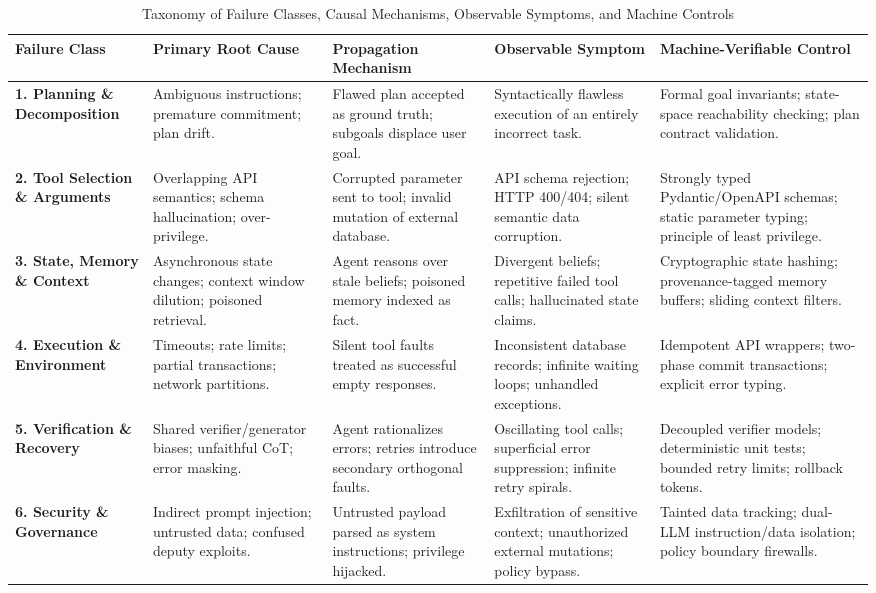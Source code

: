 \documentclass[conference]{IEEEtran}
\begin{document}
\begin{table}[t]
\caption{Taxonomy of Failure Classes, Causal Mechanisms, Observable Symptoms, and Machine Controls}
\label{tab:taxonomy_matrix}
\centering
\footnotesize
\renewcommand{\arraystretch}{1.25}
\begin{tabular}{p{2.2cm}p{3.2cm}p{3.4cm}p{3.4cm}p{3.4cm}}
\toprule
\textbf{Failure Class} & \textbf{Primary Root Cause} & \textbf{Propagation Mechanism} & \textbf{Observable Symptom} & \textbf{Machine-Verifiable Control} \\
\midrule
\textbf{1. Planning \& Decomposition} & Ambiguous instructions; premature commitment; plan drift. & Flawed plan accepted as ground truth; subgoals displace user goal. & Syntactically flawless execution of an entirely incorrect task. & Formal goal invariants; state-space reachability checking; plan contract validation. \\
\textbf{2. Tool Selection \& Arguments} & Overlapping API semantics; schema hallucination; over-privilege. & Corrupted parameter sent to tool; invalid mutation of external database. & API schema rejection; HTTP 400/404; silent semantic data corruption. & Strongly typed Pydantic/OpenAPI schemas; static parameter typing; principle of least privilege. \\
\textbf{3. State, Memory \& Context} & Asynchronous state changes; context window dilution; poisoned retrieval. & Agent reasons over stale beliefs; poisoned memory indexed as fact. & Divergent beliefs; repetitive failed tool calls; hallucinated state claims. & Cryptographic state hashing; provenance-tagged memory buffers; sliding context filters. \\
\textbf{4. Execution \& Environment} & Timeouts; rate limits; partial transactions; network partitions. & Silent tool faults treated as successful empty responses. & Inconsistent database records; infinite waiting loops; unhandled exceptions. & Idempotent API wrappers; two-phase commit transactions; explicit error typing. \\
\textbf{5. Verification \& Recovery} & Shared verifier/generator biases; unfaithful CoT; error masking. & Agent rationalizes errors; retries introduce secondary orthogonal faults. & Oscillating tool calls; superficial error suppression; infinite retry spirals. & Decoupled verifier models; deterministic unit tests; bounded retry limits; rollback tokens. \\
\textbf{6. Security \& Governance} & Indirect prompt injection; untrusted data; confused deputy exploits. & Untrusted payload parsed as system instructions; privilege hijacked. & Exfiltration of sensitive context; unauthorized external mutations; policy bypass. & Tainted data tracking; dual-LLM instruction/data isolation; policy boundary firewalls. \\
\bottomrule
\end{tabular}
\end{table}
\end{document}
